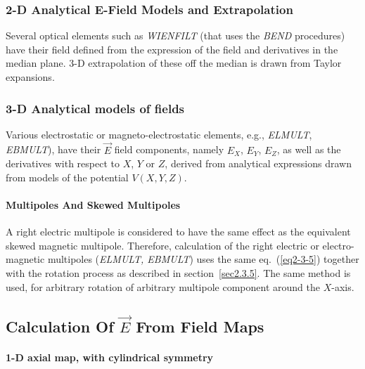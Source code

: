\subsubsection{2-D Analytical E-Field Models and Extrapolation} 

Several optical elements such as \textsl{WIENFILT} (that 
uses the \textsl{BEND} procedures) 
have their field defined from the  expression of the field and derivatives in the median plane. 
3-D extrapolation of these off the median is drawn from Taylor expansions. 





\subsubsection{3-D Analytical models of fields} \label{sec2.5.3}

 Various electrostatic or magneto-electrostatic  elements, e.g.,   \textsl{ELMULT},
  \textsl{EBMULT}), have their $ \vec  E$ field 
components,  namely $ E_X $, $ E_Y $, $ E_Z $, as well as the 
derivatives with respect to $ X$, $Y $ or $ Z $,  derived 
from  analytical expressions  drawn from  models of the potential $ V(X,Y,Z)$. 






\paragraph{Multipoles And Skewed Multipoles}

\noindent A right electric multipole is considered to have the same effect 
as the equivalent skewed magnetic multipole. Therefore, 
calculation of the right electric or electro-magnetic multipoles 
(\textsl{ELMULT, EBMULT})   uses the 
same eq.~(\ref{eq2-3-5}) together with the rotation process as described in 
section~\ref{sec2.3.5}. The same method is used, for arbitrary rotation of 
arbitrary multipole component around the $ X $-axis. 



\subsection{Calculation Of  $ \vec E$ From Field Maps} \label{sec2.6}

\paragraph{1-D axial map, with cylindrical symmetry} 

